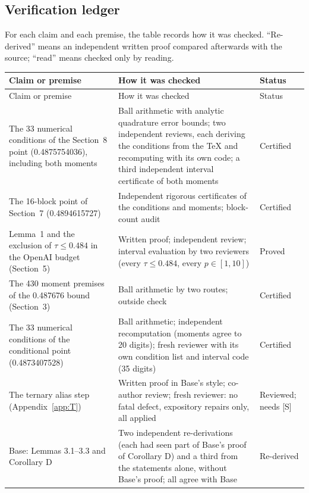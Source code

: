 \documentclass[11pt]{article}
\theoremstyle{plain}
\begin{document}
\subsection*{Verification ledger}
For each claim and each premise, the table records how it was checked. ``Re-derived'' means an independent written proof compared afterwards with the source; ``read'' means checked only by reading.

{\small
\begin{longtable}{@{}>{\raggedright\arraybackslash}p{4.2cm}>{\raggedright\arraybackslash}p{8.7cm}>{\raggedright\arraybackslash}p{2.6cm}@{}}
\toprule
Claim or premise & How it was checked & Status \\
\midrule
\endfirsthead
\toprule
Claim or premise & How it was checked & Status \\
\midrule
\endhead
\bottomrule
\endlastfoot
The 33 numerical conditions of the Section~8 point (0.4875754036), including both moments & Ball arithmetic with analytic quadrature error bounds; two independent reviews, each deriving the conditions from the \TeX{} and recomputing with its own code; a third independent interval certificate of both moments & Certified \\
The 16-block point of Section~7 (0.4894615727) & Independent rigorous certificates of the conditions and moments; block-count audit & Certified \\
Lemma~1 and the exclusion of $\tau \le 0.484$ in the OpenAI budget (Section~5) & Written proof; independent review; interval evaluation by two reviewers (every $\tau \le 0.484$, every $p \in [1,10]$) & Proved \\
The 430 moment premises of the 0.487676 bound (Section~3) & Ball arithmetic by two routes; outside check & Certified \\
The 33 numerical conditions of the conditional point (0.4873407528) & Ball arithmetic; independent recomputation (moments agree to 20 digits); fresh reviewer with its own condition list and interval code (35 digits) & Certified \\
The ternary alias step (Appendix~\ref{app:T}) & Written proof in Base's style; co-author review; fresh reviewer: no fatal defect, expository repairs only, all applied & Reviewed; needs [S] \\
Base: Lemmas 3.1--3.3 and Corollary D & Two independent re-derivations (each had seen part of Base's proof of Corollary D) and a third from the statements alone, without Base's proof; all agree with Base & Re-derived \\

\end{longtable}}
\end{document}
